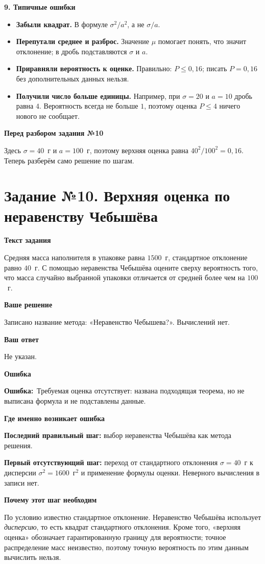\documentclass[a4paper,12pt]{article}
\newcommand{\tasktitle}[2]{\phantomsection\label{task:#1}\section*{Задание №#1. #2}}
\newcommand{\err}{\textcolor{errorred}{\textbf{Ошибка:}}\ }
\newcommand{\lab}[1]{\par\noindent\textbf{#1}\par\vspace{-4pt}}
\begin{document}
\lab{9. Типичные ошибки}
\begin{itemize}
 \item \textbf{Забыли квадрат.} В формуле $\sigma^2/a^2$, а не $\sigma/a$.
 \item \textbf{Перепутали среднее и разброс.} Значение $\mu$ помогает
 понять, что значит отклонение; в дробь подставляются $\sigma$ и $a$.
 \item \textbf{Приравняли вероятность к оценке.} Правильно:
 $P\le0{,}16$; писать $P=0{,}16$ без дополнительных данных нельзя.
 \item \textbf{Получили число больше единицы.} Например, при $\sigma=20$
 и $a=10$ дробь равна $4$. Вероятность всегда не больше $1$,
 поэтому оценка $P\le4$ ничего нового не сообщает.
\end{itemize}

\lab{Перед разбором задания №10}
Здесь $\sigma=40$~г и $a=100$~г, поэтому верхняя оценка
равна $40^2/100^2=0{,}16$. Теперь разберём само решение по шагам.

\newpage

\tasktitle{10}{Верхняя оценка по неравенству Чебышёва}
\begingroup\small\setlength{\parskip}{4pt}
\lab{Текст задания}
Средняя масса наполнителя в упаковке равна $1500$~г, стандартное отклонение равно $40$~г. С помощью неравенства Чебышёва оцените сверху вероятность того, что масса случайно выбранной упаковки отличается от средней более чем на $100$~г.

\lab{Ваше решение}
Записано название метода: «Неравенство Чебышева?». Вычислений нет.

\lab{Ваш ответ}
Не указан.

\lab{Ошибка}
\err Требуемая оценка отсутствует: названа подходящая теорема, но не выписана формула и не подставлены данные.

\lab{Где именно возникает ошибка}
\textbf{Последний правильный шаг:} выбор неравенства Чебышёва как метода решения.

\textbf{Первый отсутствующий шаг:} переход от стандартного отклонения $\sigma=40$~г к дисперсии $\sigma^2=1600$~г$^2$ и применение формулы оценки. Неверного вычисления в записи нет.

\lab{Почему этот шаг необходим}
По условию известно стандартное отклонение. Неравенство Чебышёва использует \emph{дисперсию}, то есть квадрат стандартного отклонения. Кроме того, «верхняя оценка» обозначает гарантированную границу для вероятности; точное распределение масс неизвестно, поэтому точную вероятность по этим данным вычислить нельзя.
\end{document}
